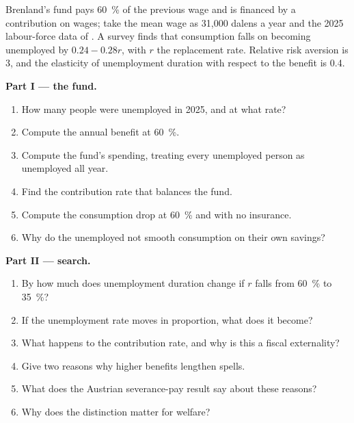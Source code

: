 \begin{problem}\label{pb:b3:social-insurance:fund}
Brenland's fund pays 60~\% of the previous wage and is financed by a contribution on
wages; take the mean wage as 31{,}000 dalens a year and the 2025 labour-force data of
. A survey finds that consumption falls on becoming
unemployed by $0.24 - 0.28r$, with $r$ the replacement rate. Relative risk aversion is 3, and
the elasticity of unemployment duration with respect to the benefit is 0.4.

\medskip\noindent\textbf{Part I --- the fund.}
\begin{enumerate}
\item How many people were unemployed in 2025, and at what rate?
\item Compute the annual benefit at 60~\%.
\item Compute the fund's spending, treating every unemployed person as unemployed
all year.
\item Find the contribution rate that balances the fund.
\item Compute the consumption drop at 60~\% and with no insurance.
\item Why do the unemployed not smooth consumption on their own savings?
\end{enumerate}

\medskip\noindent\textbf{Part II --- search.}
\begin{enumerate}[resume]
\item By how much does unemployment duration change if $r$ falls from 60~\% to 35~\%?
\item If the unemployment rate moves in proportion, what does it become?
\item What happens to the contribution rate, and why is this a fiscal externality?
\item Give two reasons why higher benefits lengthen spells.
\item What does the Austrian severance-pay result say about these reasons?
\item Why does the distinction matter for welfare?
\end{enumerate}


\end{problem}
